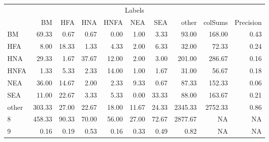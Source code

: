 \begin{table}
\centering\begingroup\fontsize{11}{13}\selectfont

\begin{tabular}{lrrrrrr>{}r|rr}
\toprule
\multicolumn{10}{c}{Labels} \\
\cmidrule(l{3pt}r{3pt}){1-10}
  & BM & HFA & HNA & HNFA & NEA & SEA & other & colSums & Precision\\
\midrule
BM & 69.33 & 0.67 & 0.67 & 0.00 & 1.00 & 3.33 & 93.00 & 168.00 & 0.43\\
HFA & 8.00 & 18.33 & 1.33 & 4.33 & 2.00 & 6.33 & 32.00 & 72.33 & 0.24\\
HNA & 29.33 & 1.67 & 37.67 & 12.00 & 2.00 & 3.00 & 201.00 & 286.67 & 0.16\\
HNFA & 1.33 & 5.33 & 2.33 & 14.00 & 1.00 & 1.67 & 31.00 & 56.67 & 0.18\\
NEA & 36.00 & 14.67 & 2.00 & 2.33 & 9.33 & 0.67 & 87.33 & 152.33 & 0.06\\
\addlinespace
SEA & 11.00 & 22.67 & 3.33 & 5.33 & 0.00 & 33.33 & 88.00 & 163.67 & 0.21\\
other & 303.33 & 27.00 & 22.67 & 18.00 & 11.67 & 24.33 & 2345.33 & 2752.33 & 0.86\\
8 & 458.33 & 90.33 & 70.00 & 56.00 & 27.00 & 72.67 & 2877.67 & NA & NA\\
9 & 0.16 & 0.19 & 0.53 & 0.16 & 0.33 & 0.49 & 0.82 & NA & NA\\
\bottomrule
\end{tabular}
\endgroup{}
\end{table}
